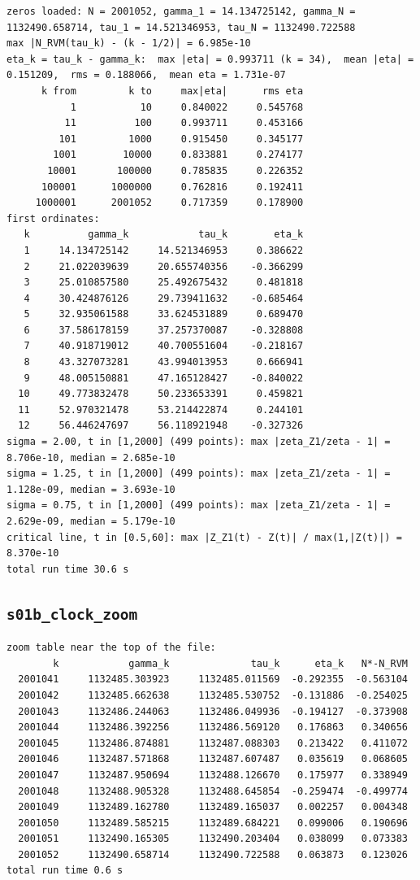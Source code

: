\documentclass[11pt,reqno]{amsart}
\numberwithin{equation}{section}
\theoremstyle{plain}
\theoremstyle{definition}
\theoremstyle{remark}
\begin{document}
\begin{lstlisting}[style=out]
zeros loaded: N = 2001052, gamma_1 = 14.134725142, gamma_N = 1132490.658714, tau_1 = 14.521346953, tau_N = 1132490.722588
max |N_RVM(tau_k) - (k - 1/2)| = 6.985e-10
eta_k = tau_k - gamma_k:  max |eta| = 0.993711 (k = 34),  mean |eta| = 0.151209,  rms = 0.188066,  mean eta = 1.731e-07
      k from         k to     max|eta|      rms eta
           1           10     0.840022     0.545768
          11          100     0.993711     0.453166
         101         1000     0.915450     0.345177
        1001        10000     0.833881     0.274177
       10001       100000     0.785835     0.226352
      100001      1000000     0.762816     0.192411
     1000001      2001052     0.717359     0.178900
first ordinates:
   k          gamma_k            tau_k        eta_k
   1     14.134725142     14.521346953     0.386622
   2     21.022039639     20.655740356    -0.366299
   3     25.010857580     25.492675432     0.481818
   4     30.424876126     29.739411632    -0.685464
   5     32.935061588     33.624531889     0.689470
   6     37.586178159     37.257370087    -0.328808
   7     40.918719012     40.700551604    -0.218167
   8     43.327073281     43.994013953     0.666941
   9     48.005150881     47.165128427    -0.840022
  10     49.773832478     50.233653391     0.459821
  11     52.970321478     53.214422874     0.244101
  12     56.446247697     56.118921948    -0.327326
sigma = 2.00, t in [1,2000] (499 points): max |zeta_Z1/zeta - 1| = 8.706e-10, median = 2.685e-10
sigma = 1.25, t in [1,2000] (499 points): max |zeta_Z1/zeta - 1| = 1.128e-09, median = 3.693e-10
sigma = 0.75, t in [1,2000] (499 points): max |zeta_Z1/zeta - 1| = 2.629e-09, median = 5.179e-10
critical line, t in [0.5,60]: max |Z_Z1(t) - Z(t)| / max(1,|Z(t)|) = 8.370e-10
total run time 30.6 s
\end{lstlisting}

\subsection{\texttt{s01b\_clock\_zoom}}
\label{app:out-s01b-clock-zoom}

\begin{lstlisting}[style=out]
zoom table near the top of the file:
        k            gamma_k              tau_k      eta_k   N*-N_RVM
  2001041     1132485.303923     1132485.011569  -0.292355  -0.563104
  2001042     1132485.662638     1132485.530752  -0.131886  -0.254025
  2001043     1132486.244063     1132486.049936  -0.194127  -0.373908
  2001044     1132486.392256     1132486.569120   0.176863   0.340656
  2001045     1132486.874881     1132487.088303   0.213422   0.411072
  2001046     1132487.571868     1132487.607487   0.035619   0.068605
  2001047     1132487.950694     1132488.126670   0.175977   0.338949
  2001048     1132488.905328     1132488.645854  -0.259474  -0.499774
  2001049     1132489.162780     1132489.165037   0.002257   0.004348
  2001050     1132489.585215     1132489.684221   0.099006   0.190696
  2001051     1132490.165305     1132490.203404   0.038099   0.073383
  2001052     1132490.658714     1132490.722588   0.063873   0.123026
total run time 0.6 s
\end{lstlisting}
\end{document}
